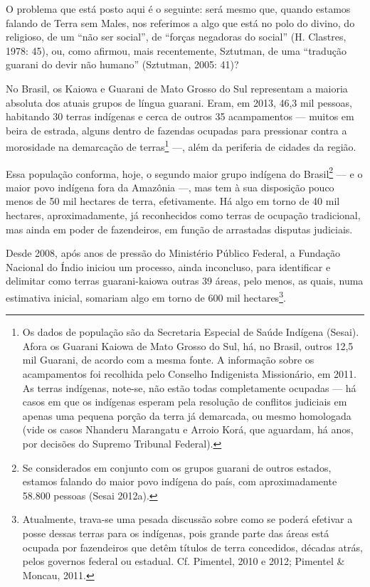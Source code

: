 O problema que está posto aqui é o seguinte: será mesmo que, quando
estamos falando de Terra sem Males, nos referimos a algo que está no
polo do divino, do religioso, de um ``não ser social'', de ``forças
negadoras do social'' (H. Clastres, 1978: 45), ou, como afirmou, mais
recentemente, Sztutman, de uma ``tradução guarani do devir não humano''
(Sztutman, 2005: 41)?

No Brasil, os Kaiowa e Guarani de Mato Grosso do Sul representam a
maioria absoluta dos atuais grupos de língua guarani. Eram, em 2013,
46,3 mil pessoas, habitando 30 terras indígenas e cerca de outros 35
acampamentos — muitos em beira de estrada, alguns dentro de fazendas
ocupadas para pressionar contra a morosidade na demarcação de
terras\footnote{Os dados de população são da Secretaria Especial de
Saúde Indígena (Sesai). Afora os Guarani Kaiowa de Mato Grosso do Sul,
há, no Brasil, outros 12,5 mil Guarani, de acordo com a mesma fonte. A
informação sobre os acampamentos foi recolhida pelo Conselho
Indigenista Missionário, em 2011. As terras indígenas, note-se, não
estão todas completamente ocupadas — há casos em que os indígenas
esperam pela resolução de conflitos judiciais em apenas uma pequena
porção da terra já demarcada, ou mesmo homologada (vide os casos
Nhanderu Marangatu e Arroio Korá, que aguardam, há anos, por decisões
do Supremo Tribunal Federal).} —, além da periferia de cidades da
região.

Essa população conforma, hoje, o segundo maior grupo indígena do
Brasil\footnote{Se considerados em conjunto com os grupos guarani de
outros estados, estamos falando do maior povo indígena do país, com
aproximadamente 58.800 pessoas (Sesai 2012a).} — e o maior povo
indígena fora da Amazônia —, mas tem à sua disposição pouco menos de 50
mil hectares de terra, efetivamente. Há algo em torno de 40 mil
hectares, aproximadamente, já reconhecidos como terras de ocupação
tradicional, mas ainda em poder de fazendeiros, em função de arrastadas
disputas judiciais. 

Desde 2008, após anos de pressão do Ministério Público Federal, a
Fundação Nacional do Índio iniciou um processo, ainda inconcluso, para
identificar e delimitar como terras guarani-kaiowa outras 39 áreas,
pelo menos, as quais, numa estimativa inicial, somariam algo em torno
de 600 mil hectares\footnote{Atualmente, trava-se uma pesada discussão
sobre como se poderá efetivar a posse dessas terras para os indígenas,
pois grande parte das áreas está ocupada por fazendeiros que detêm
títulos de terra concedidos, décadas atrás, pelos governos federal ou
estadual. Cf. Pimentel, 2010 e 2012; Pimentel \& Moncau, 2011.}. 

